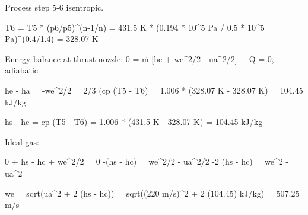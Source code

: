 Process step 5-6 isentropic.

T6 = T5 * (p6/p5)^(n-1/n) = 431.5 K * (0.194 * 10^5 Pa / 0.5 * 10^5 Pa)^(0.4/1.4) = 328.07 K

Energy balance at thrust nozzle:
0 = ṁ [he + we^2/2 - ua^2/2] + Q̇ = 0, adiabatic

he - ha = -we^2/2 = 2/3 (cp (T5 - T6) = 1.006 * (328.07 K - 328.07 K) = 104.45 kJ/kg

hs - hc = cp (T5 - T6) = 1.006 * (431.5 K - 328.07 K) = 104.45 kJ/kg

Ideal gas:

0 + hs - hc + we^2/2 = 0
-(hs - hc) = we^2/2 - ua^2/2
-2 (hs - hc) = we^2 - ua^2

we = sqrt(ua^2 + 2 (hs - hc)) = sqrt((220 m/s)^2 + 2 (104.45) kJ/kg) = 507.25 m/s